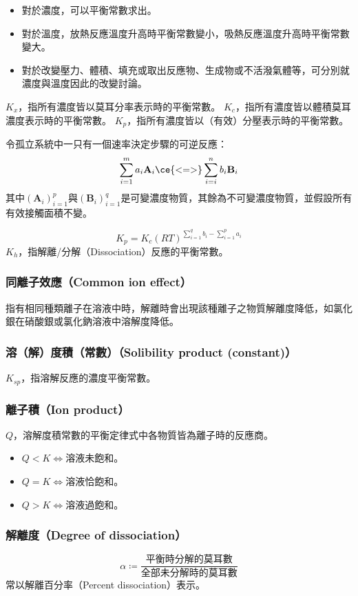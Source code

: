 \documentclass[a4paper,12pt]{report}
\begin{document}
\begin{itemize}
\begin{itemize}
\item 對於濃度，可以平衡常數求出。
\item 對於溫度，放熱反應溫度升高時平衡常數變小，吸熱反應溫度升高時平衡常數變大。
\item 對於改變壓力、體積、填充或取出反應物、生成物或不活潑氣體等，可分別就濃度與溫度因此的改變討論。
\end{itemize}
$K_x$，指所有濃度皆以莫耳分率表示時的平衡常數。
$K_c$，指所有濃度皆以體積莫耳濃度表示時的平衡常數。
$K_p$，指所有濃度皆以（有效）分壓表示時的平衡常數。

令孤立系統中一只有一個速率決定步驟的可逆反應：
\[\sum_{i=1}^ma_i\mathbf{A}_i\ce{<=>}\sum_{i=i}^nb_i\mathbf{B}_i\]
其中$(\mathbf{A}_i)_{i=1}^p$與$(\mathbf{B}_i)_{i=1}^q$是可變濃度物質，其餘為不可變濃度物質，並假設所有有效接觸面積不變。

\[K_p=K_c(RT)^{\sum_{i=1}^qb_i-\sum_{i=1}^pa_i}\]
$K_h$，指解離/分解（Dissociation）反應的平衡常數。
\subsubsection{同離子效應（Common ion effect）}
指有相同種類離子在溶液中時，解離時會出現該種離子之物質解離度降低，如氯化銀在硝酸銀或氯化鈉溶液中溶解度降低。
\subsubsection{溶（解）度積（常數）（Solibility product (constant)）}
$K_{sp}$，指溶解反應的濃度平衡常數。
\subsubsection{離子積（Ion product）}
$Q$，溶解度積常數的平衡定律式中各物質皆為離子時的反應商。
\begin{itemize}
\item $Q<K\iff$溶液未飽和。
\item $Q=K\iff$溶液恰飽和。
\item $Q>K\iff$溶液過飽和。
\end{itemize}
\subsubsection{解離度（Degree of dissociation）}
\[\alpha\coloneq\frac{\text{平衡時分解的莫耳數}}{\text{全部未分解時的莫耳數}}\]
常以解離百分率（Percent dissociation）表示。

\end{itemize}
\end{document}

